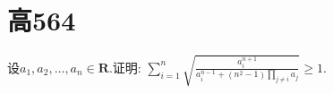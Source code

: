 \documentclass[]{article}
\title{}
\author{}
\date{}
\begin{document}
\maketitle
\section{高564}{
设$a_1,a_2,…,a_n \in \mathbf{R}$.证明:
$\displaystyle \sum\limits_{i=1}^n\sqrt{\frac{a_i^{n+1}}{a_i^{n-1}+(n^2-1)\prod\limits_{j \ne i}a_j}} \geq 1$.
}
\end{document}
